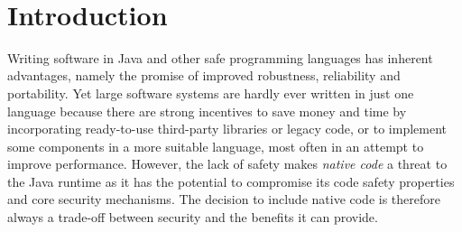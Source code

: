 \documentclass[a4paper,12pt,twoside,openright]{report}
\begin{document}

\pagestyle{empty}
\singlespacing

\onehalfspacing

\singlespacing


\setcounter{page}{0}
\pagestyle{plain}
\tableofcontents

\onehalfspacing
\newpage ~ \cleardoublepage %

\setcounter{page}{1} 

\chapter{Introduction}

Writing software in Java and other safe programming languages has inherent advantages, namely the promise of improved robustness, reliability and portability. Yet large software systems are hardly ever written in just one language because there are strong incentives to save money and time by incorporating ready-to-use third-party libraries or legacy code, or to implement some components in a more suitable language, most often in an attempt to improve performance. However, the lack of safety makes \emph{native code} a threat to the Java runtime as it has the potential to compromise its code safety properties and core security mechanisms. The decision to include native code is therefore always a trade-off between security and the benefits it can provide.
 
\end{document}
